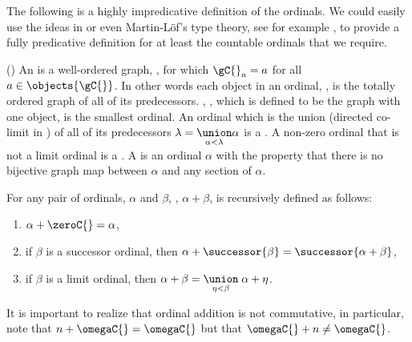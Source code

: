 The following is a highly impredicative definition of the ordinals.  We could easily use
the ideas in \cite{joyalMoerdijk1995algSetTh} or even Martin-L\"{o}f's type theory, see
for example \cite{dybjer1991inductiveSets}, to provide a fully predicative definition for
at least the countable ordinals that we require.
\begin{definition}
(\cite{cameron1999a})  An  is a well-ordered graph, \gC{}, for which
$\gC{}_a = a$ for all $a \in \objects{\gC{}}$.   In other words each object in an ordinal,
\gC{}, is the totally ordered graph of all of its predecessors. , \zeroC{},
which is defined to be the graph with one object, is the smallest ordinal.  An ordinal
which is the union (directed co-limit in \totalOrderedC{}) of all of its predecessors
$\lambda = \underset{\alpha < \lambda}{\union} \alpha$ is a . A
non-zero ordinal that is not a limit ordinal is a . A
 is an ordinal $\alpha$ with the property that there is no bijective
graph map between $\alpha$ and any section of $\alpha$. 
\end{definition}

\begin{definition}
For any pair of ordinals, $\alpha$ and $\beta$, , $\alpha +
\beta$, is recursively defined as follows:
\begin{enumerate}
\item $\alpha + \zeroC{} = \alpha$,
\item if $\beta$ is a successor ordinal, then $\alpha + \successor{\beta} =
\successor{\alpha + \beta}$,
\item if $\beta$ is a limit ordinal, then $\alpha + \beta = \underset{\eta <
\beta}{\union} \; \alpha + \eta$.
\end{enumerate}
\end{definition}
It is important to realize that ordinal addition is not commutative, in particular, note
that $n + \omegaC{} = \omegaC{}$ but that $\omegaC{} + n \neq \omegaC{}$. 


